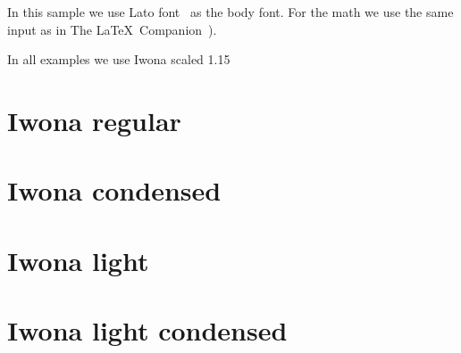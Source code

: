 \documentclass{article}
\begin{document}
In this sample we use Lato font~\citep{lato} as the body font.  For the math we
use the same input as in The \LaTeX\ Companion~\citep[\S~12.5]{TLC3}).


In all examples we use Iwona scaled 1.15

\section*{Iwona regular}

\sample

\section*{Iwona condensed}

\sample

\section*{Iwona light}

\sample

\section*{Iwona light condensed}

\sample





\end{document}
